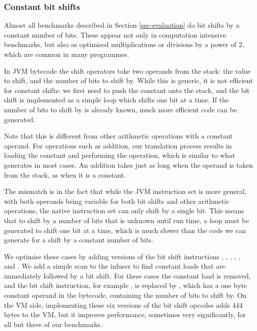 \subsubsection{Constant bit shifts}
\label{sec-opt-constant-shift}

Almost all benchmarks described in Section \ref{sec-evaluation} do bit shifts by a constant number of bits. These appear not only in computation intensive benchmarks, but also as optimised multiplications or divisions by a power of 2, which are common in many programmes.

In JVM bytecode the shift operators take two operands from the stack: the value to shift, and the number of bits to shift by. While this is generic, it is not efficient for constant shifts: we first need to push the constant onto the stack, and the bit shift is implemented as a simple loop which shifts one bit at a time. If the number of bits to shift by is already known, much more efficient code can be generated.

Note that this is different from other arithmetic operations with a constant operand. For operations such as addition, our translation process results in loading the constant and performing the operation, which is similar to what  generates in most cases. An addition takes just as long when the operand is taken from the stack, as when it is a constant. 

The mismatch is in the fact that while the JVM instruction set is more general, with both operands being variable for both bit shifts and other arithmetic operations, the native instruction set can only shift by a single bit. This means that to shift by a number of bits that is unknown until run time, a loop must be generated to shift one bit at a time, which is much slower than the code we can generate for a shift by a constant number of bits.

We optimise these cases by adding  versions of the bit shift instructions , , , , , and . We add a simple scan to the infuser to find constant loads that are immediately followed by a bit shift. For these cases the constant load is removed, and the bit shift instruction, for example , is replaced by , which has a one byte constant operand in the bytecode, containing the number of bits to shift by. On the VM side, implementing these six  versions of the bit shift opcodes adds 444 bytes to the VM, but it improves performance, sometimes very significantly, for all but three of our benchmarks.

